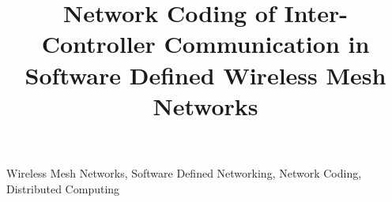 \documentclass[10pt,conference,final]{IEEEtran}
\newcommand{\Hide}[1]{%
	{ 
		\parindent0pt
		\emph{\scriptsize #1}
	}
}
\newcommand{\documenttitle}{Network Coding of Inter-Controller Communication in Software Defined Wireless Mesh Networks}
\begin{document}
	
	\title{\documenttitle}
	
	
	\author{
	}
	
	
	\maketitle
	
	
	\begin{abstract} 
		
		
	\end{abstract}
	
	\begin{IEEEkeywords}
		Wireless Mesh Networks, Software Defined Networking, Network Coding, Distributed Computing
	\end{IEEEkeywords}
	
\end{document}
